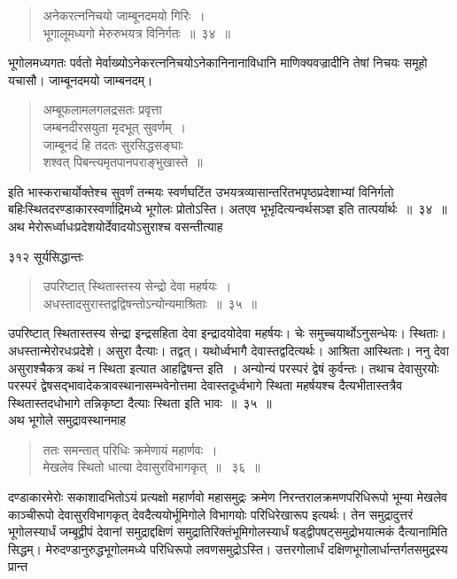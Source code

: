 \documentclass[11pt, openany]{book}
\begin{document}
 \begin{quote}
{\ssi अनेकरत्ननिचयो जाम्बूनदमयो गिरिः~।\\
भूगालूमध्यगो मेरुरुभयत्र विनिर्गतः~॥~३४~॥  }
\end{quote}
 भूगोलमध्यगतः पर्वतो मेर्वाख्योऽनेकरत्ननिचयोऽनेकानिनानाविधानि माणिक्यवज्रादीनि तेषां निचयः समूहो यचासौ। जाम्बूनदमयो जाम्बनदम्। 

\begin{quote}
{\qt अम्बूफलामलगलद्रसतः प्रवृत्ता \\
 जम्बनदीरसयुता मृदभूत् सुवर्णम्~। \\
जाम्बूनदं हि तदतः सुरसिद्धसङ्घाः \\
शश्वत् पिबन्त्यमृतपानपराङ्भुखास्ते~॥ }
\end{quote}
इति भास्कराचार्योक्तेश्च सुवर्णं तन्मयः स्वर्णघटिंत उभयत्रव्यासान्तरितभपृष्ठप्रदेशाभ्यां विनिर्गतो बहिःस्थितदरण्डाकारस्वर्णाद्रिमध्ये भूगोलः प्रोतोऽस्ति। अतएव भूभृदित्यन्वर्थसञ्ज्ञ इति तात्पर्यार्थः~॥~३४~॥ \\
\noindent अथ मेरोरूर्ध्वाधःप्रदेशयोर्देवादयोऽसुराश्च वसन्तीत्याह \textendash


\newpage


\noindent ३१२ \hspace{4cm} सूर्यसिद्धान्तः
\vspace{1cm}

%

 \begin{quote}
{\ssi उपरिष्टात् स्थितास्तस्य सेन्द्रो देवा महर्षयः~।\\
अधस्तादसुरास्तद्वद्विषन्तोऽन्योन्यमाश्रिताः~॥~३५~॥}
\end{quote}
 उपरिष्टात् स्थितास्तस्य सेन्द्रा इन्द्रसहिता देवा इन्द्रादयोदेवा महर्षयः। चेः समुच्चयार्थोऽनुसन्धेयः। स्थिताः। अधस्तान्मेरोरधःप्रदेशे। असुरा दैत्याः। तद्वत्। यथोर्ध्वभागै देवास्तद्वदित्यर्थः। आश्रिता आस्थिताः। ननु देवा असुराश्चैकत्र कथं न स्थिता इत्यात आह\textendash द्विषन्त इति~। अन्योन्यं परस्परं द्वेषं कुर्वन्तः। तथाच देवासुरयोः परस्परं द्वेषसद्भावादेकत्रावस्थानासम्भवेनोत्तमा देवास्तदूर्ध्वभागे स्थिता महर्षयश्च दैत्यभीतास्तत्रैव स्थितास्तदधोभागे तन्निकृष्टा दैत्याः स्थिता इति भावः~॥~३५~॥\\
\noindent अथ भूगोले समुद्रावस्थानमाह \textendash

 \begin{quote}
{\ssi ततः समन्तात् परिधिः क्रमेणायं महार्णवः~।\\
मेखलेव स्थितो धात्या देवासुरविभागकृत्~॥~ ३६~॥ }
\end{quote}
 दण्डाकारमेरोः सकाशादभितोऽयं प्रत्यक्षो महार्णवो महासमुद्रः क्रमेण निरन्तरालक्रमणपरिधिरूपो भूम्या मेखलेव काञ्चीरूपो देवासुरविभागकृत् देवदैत्ययोर्भूमिगोले विभागयोः परिधिरेखारूप इत्यर्थः। तेन समुद्रादुत्तरं भूगोलस्यार्धं जम्बूद्वीपं देवानां समुद्राद्दक्षिणं समुद्रातिरिक्तंभूमिगोलस्यार्धं षड्द्वीपषट्समुद्रोभयात्मकं दैत्यानामिति सिद्धम्। मेरुदण्डानुरुद्धभूगोलमध्ये परिधिरूपो लवणसमुद्रोऽस्ति। उत्तरगोलार्धं दक्षिणभूगोलार्धान्तर्गतसमुद्रस्य प्रान्त \textendash
%
\end{document}
